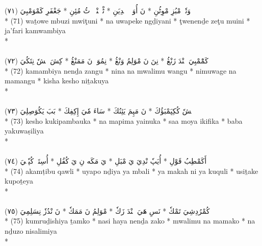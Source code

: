 \documentclass[a4paper, 12pt]{report}
\begin{document}
\begin{center}
\textarabic{(٧١) \textcolor{mygreen}{وَتٗوٖ مْبُزِ مْوِٹُنِ  * نَ أُوَپٖكٖ ݝْدِيَنِ  * ٹْوٖنٖنْدٖ زٖٹُ مُئِنِ  * جَعْفَرِ كَمْوَمْبِيَ }} \\* 
(71) waṯowe mbuzi mwiţuni  * na uwapeke ngḏiyani  * ţwenenḏe zeţu muini  * ja'fari kamwambiya  \\* 
 \\ 
\\[8mm] 

\textarabic{(٧٢) \textcolor{mygreen}{كَمَْمْبِيَ نٖنْدَ زَنْڠُ  * نِنَ نَ مْوَلِمُ وَنْڠُ  * نِمُوَڠٖ نَ مَمَنْڠُ  * كِشَ كٖشٗ نِتَكُيَ }} \\* 
(72) kamambiya nenḏa zangu  * nina na mwalimu wangu  * nimuwage na mamangu  * kisha kesho niṯakuya  \\* 
 \\ 
\\[8mm] 

\textarabic{(٧٣) \textcolor{mygreen}{كٖشٗ كُكِپَمْبَؤُكَ  * نَ مَپِمَ يَئِنُكَ  * سَاءَ مٗيَ إِكِفِكَ  * بَبَ يَكُوَصِلِيَ }} \\* 
(73) kesho kukipambauka  * na mapima yainuka  * saa moya ikifika  * baba yakuwaṣiliya  \\* 
 \\ 
\\[8mm] 

\textarabic{(٧٤) \textcolor{mygreen}{أَكَمْطِبُ قَوْلِ  * أُيَپٗ نْدِيَ يَ مْبَلِ  * يَ مَكَه نِ يَ كُقُلِ  * أُسِتَكٖ كُپٗتٖيَ }} \\* 
(74) akamṭibu qawli  * uyapo nḏiya ya mbali  * ya makah ni ya kuquli  * usiṯake kupoṯeya  \\* 
 \\ 
\\[8mm] 

\textarabic{(٧٥) \textcolor{mygreen}{كُمْرُدِشِيَ تَمْكٗ  * نَسِ هَيَ نٖنْدَ زَكٗ  * مْوَلِمُ نَ مَمَكٗ  * نَ نْدُزٗ نِسَلِمِيَ }} \\* 
(75) kumruḏishiya ṯamko  * nasi haya nenḏa zako  * mwalimu na mamako  * na nḏuzo nisalimiya  \\* 
 \\ 
\\[8mm] 


\end{center}
\end{document}
